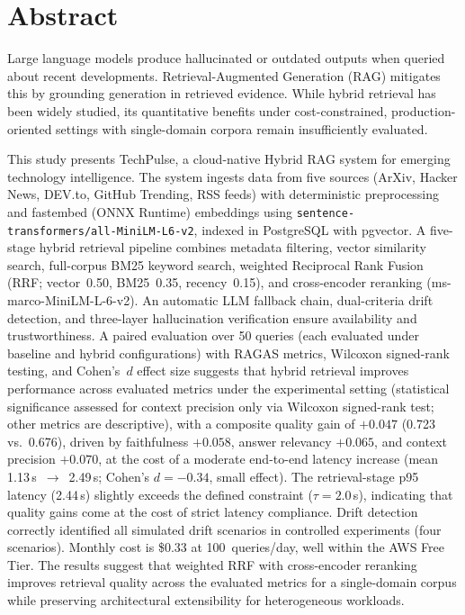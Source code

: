 \chapter*{Abstract}

Large language models produce hallucinated or outdated outputs when queried about recent developments. Retrieval-Augmented Generation (RAG) mitigates this by grounding generation in retrieved evidence. While hybrid retrieval has been widely studied, its quantitative benefits under cost-constrained, production-oriented settings with single-domain corpora remain insufficiently evaluated.

This study presents TechPulse, a cloud-native Hybrid RAG system for emerging technology intelligence. The system ingests data from five sources (ArXiv, Hacker News, DEV.to, GitHub Trending, RSS feeds) with deterministic preprocessing and fastembed (ONNX Runtime) embeddings using \texttt{sentence-transformers/all-MiniLM-L6-v2}, indexed in PostgreSQL with pgvector. A five-stage hybrid retrieval pipeline combines metadata filtering, vector similarity search, full-corpus BM25 keyword search, weighted Reciprocal Rank Fusion (RRF; vector~0.50, BM25~0.35, recency~0.15), and cross-encoder reranking (ms-marco-MiniLM-L-6-v2). An automatic LLM fallback chain, dual-criteria drift detection, and three-layer hallucination verification ensure availability and trustworthiness. A paired evaluation over 50 queries (each evaluated under baseline and hybrid configurations) with RAGAS metrics, Wilcoxon signed-rank testing, and Cohen's~$d$ effect size suggests that hybrid retrieval improves performance across evaluated metrics under the experimental setting (statistical significance assessed for context precision only via Wilcoxon signed-rank test; other metrics are descriptive), with a composite quality gain of $+0.047$ (0.723 vs.\ 0.676), driven by faithfulness $+0.058$, answer relevancy $+0.065$, and context precision $+0.070$, at the cost of a moderate end-to-end latency increase (mean 1.13\,s~$\to$~2.49\,s; Cohen's $d = -0.34$, small effect). The retrieval-stage p95 latency (2.44\,s) slightly exceeds the defined constraint ($\tau = 2.0$\,s), indicating that quality gains come at the cost of strict latency compliance. Drift detection correctly identified all simulated drift scenarios in controlled experiments (four scenarios). Monthly cost is \$0.33 at 100~queries/day, well within the AWS Free Tier. The results suggest that weighted RRF with cross-encoder reranking improves retrieval quality across the evaluated metrics for a single-domain corpus while preserving architectural extensibility for heterogeneous workloads.

